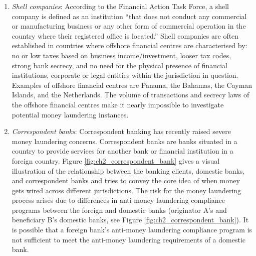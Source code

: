 \begin{enumerate}
\item \textit{Shell companies}: According to the Financial Action Task Force, a shell company is defined as an institution ``that does not conduct any commercial or manufacturing business or any other form of commercial operation in the country where their registered office is located.'' Shell companies are often established in countries where offshore financial centres are characterised by: no or low taxes based on business income/investment, looser tax codes, strong bank secrecy, and no need for the physical presence of financial institutions, corporate or legal entities within the jurisdiction in question. Examples of offshore financial centres are Panama, the Bahamas, the Cayman Islands, and the Netherlands. The volume of transactions and secrecy laws of the offshore financial centres make it nearly impossible to investigate potential money laundering instances.   

\item \textit{Correspondent banks}: Correspondent banking has recently raised severe money laundering concerns. Correspondent banks are banks situated in a country to provide services for another bank or financial institution in a foreign country. Figure \ref{fig:ch2_correspondent_bank} gives a visual illustration of the relationship between the banking clients, domestic banks, and correspondent banks and tries to convey the core idea of when money gets wired across different jurisdictions. The risk for the money laundering process arises due to differences in anti-money laundering compliance programs between the foreign and domestic banks (originator A's and beneficiary B's domestic banks, see Figure \ref{fig:ch2_correspondent_bank}). It is possible that a foreign bank's anti-money laundering compliance program is not sufficient to meet the anti-money laundering requirements of a domestic bank.


\end{enumerate}
